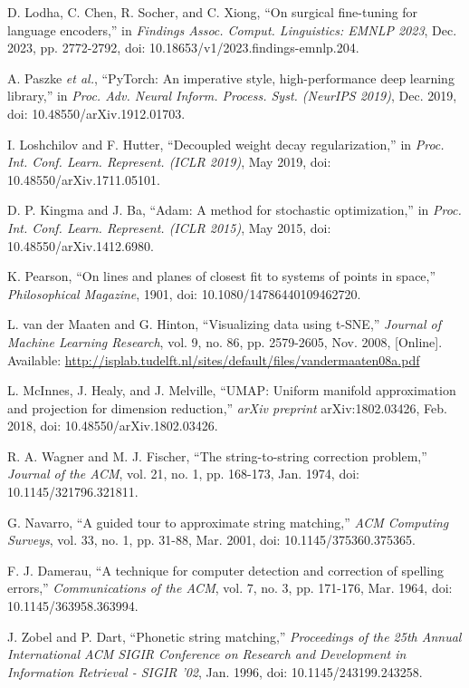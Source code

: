 \documentclass[12pt]{article}
\begin{document}
\begin{thebibliography}{99}
D. Lodha, C. Chen, R. Socher, and C. Xiong, ``On surgical fine-tuning for language encoders,'' in \textit{Findings Assoc. Comput. Linguistics: EMNLP 2023}, Dec. 2023, pp. 2772-2792, doi: 10.18653/v1/2023.findings-emnlp.204.

A. Paszke \textit{et al.}, ``PyTorch: An imperative style, high-performance deep learning library,'' in \textit{Proc. Adv. Neural Inform. Process. Syst. (NeurIPS 2019)}, Dec. 2019, doi: 10.48550/arXiv.1912.01703.

I. Loshchilov and F. Hutter, ``Decoupled weight decay regularization,'' in \textit{Proc. Int. Conf. Learn. Represent. (ICLR 2019)}, May 2019, doi: 10.48550/arXiv.1711.05101.

D. P. Kingma and J. Ba, ``Adam: A method for stochastic optimization,'' in \textit{Proc. Int. Conf. Learn. Represent. (ICLR 2015)}, May 2015, doi: 10.48550/arXiv.1412.6980.

K. Pearson, ``On lines and planes of closest fit to systems of points in space,'' \textit{Philosophical Magazine}, 1901, doi: 10.1080/14786440109462720.

L. van der Maaten and G. Hinton, ``Visualizing data using t-SNE,'' \textit{Journal of Machine Learning Research}, vol. 9, no. 86, pp. 2579-2605, Nov. 2008, [Online]. Available: \url{http://isplab.tudelft.nl/sites/default/files/vandermaaten08a.pdf}

L. McInnes, J. Healy, and J. Melville, ``UMAP: Uniform manifold approximation and projection for dimension reduction,'' \textit{arXiv preprint} arXiv:1802.03426, Feb. 2018, doi: 10.48550/arXiv.1802.03426.

R. A. Wagner and M. J. Fischer, ``The string-to-string correction problem,'' \textit{Journal of the ACM}, vol. 21, no. 1, pp. 168-173, Jan. 1974, doi: 10.1145/321796.321811.

G. Navarro, ``A guided tour to approximate string matching,'' \textit{ACM Computing Surveys}, vol. 33, no. 1, pp. 31-88, Mar. 2001, doi: 10.1145/375360.375365.

F. J. Damerau, ``A technique for computer detection and correction of spelling errors,'' \textit{Communications of the ACM}, vol. 7, no. 3, pp. 171-176, Mar. 1964, doi: 10.1145/363958.363994.

J. Zobel and P. Dart, ``Phonetic string matching,'' \textit{Proceedings of the 25th Annual International ACM SIGIR Conference on Research and Development in Information Retrieval - SIGIR '02}, Jan. 1996, doi: 10.1145/243199.243258.

\end{thebibliography}
\end{document}
